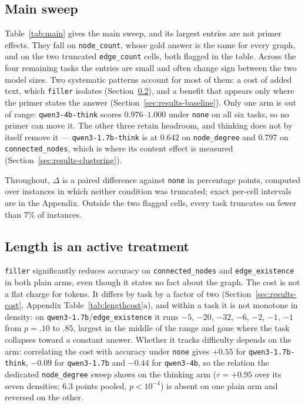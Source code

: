 \documentclass[11pt]{article}
\begin{document}
\subsection{Main sweep}
\label{sec:results-main}



Table~\ref{tab:main} gives the main sweep, and its largest entries are not
primer effects. They fall on \texttt{node\_count}, whose gold answer is the
same for every graph, and on the two truncated \texttt{edge\_count} cells,
both flagged in the table. Across the four remaining tasks the entries are
small and often change sign between the two model sizes. Two systematic
patterns account for most of them: a cost of added text, which
\texttt{filler} isolates (Section~\ref{sec:results-length}), and a benefit
that appears only where the primer states the answer
(Section~\ref{sec:results-baseline}). Only one arm is out of range:
\texttt{qwen3-4b-think} scores $0.976$--$1.000$ under \texttt{none} on all
six tasks, so no primer can move it. The other three retain headroom, and
thinking does not by itself remove it --- \texttt{qwen3-1.7b-think} is at
$0.642$ on \texttt{node\_degree} and $0.797$ on \texttt{connected\_nodes},
which is where its content effect is measured
(Section~\ref{sec:results-clustering}).

Throughout, $\Delta$ is a paired difference against \texttt{none} in
percentage points, computed over instances in which neither condition was
truncated; exact per-cell intervals are in the Appendix. Outside the
two flagged cells, every task truncates on fewer than $7\%$ of instances.

\subsection{Length is an active treatment}
\label{sec:results-length}

\texttt{filler} significantly reduces accuracy on
\texttt{connected\_nodes} and \texttt{edge\_existence} in both plain arms,
even though it states no fact about the graph. The cost is not a flat
charge for tokens. It differs by task by a factor of two
(Section~\ref{sec:results-cost}, Appendix Table~\ref{tab:lengthcost}a), and
within a
task it is not monotone in density: on
\texttt{qwen3-1.7b}/\texttt{edge\_existence} it runs $-5$, $-20$, $-32$,
$-6$, $-2$, $-1$, $-1$ from $p{=}.10$ to $.85$, largest in the middle of
the range and gone where the task collapses toward a constant
answer. Whether it tracks difficulty depends on the arm: correlating the
cost with accuracy under \texttt{none} gives $+0.55$ for
\texttt{qwen3-1.7b-think}, $-0.09$ for \texttt{qwen3-1.7b} and $-0.44$ for
\texttt{qwen3-4b}, so the relation the dedicated \texttt{node\_degree}
sweep shows on the thinking arm ($r{=}{+}0.95$ over its seven densities;
$6.3$ points pooled, $p{<}10^{-4}$) is absent on one plain arm and reversed
on the other.
\end{document}
